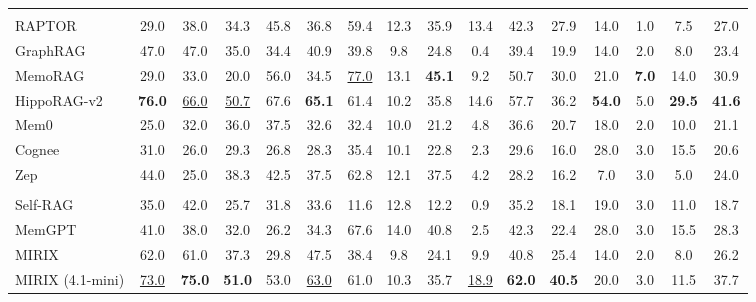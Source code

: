 \begin{table}[t]
{\begin{tabular}{l|cccc>{\columncolor{avgcolor}}c|cc>{\columncolor{avgcolor}}c|cc>{\columncolor{avgcolor}}c|cc>{\columncolor{avgcolor}}c|>{\columncolor{overallcolor}}c}
        \rowcolor{groupgreen}
        \multicolumn{16}{c}{\emph{Structure-Augmented RAG Agents}} \\
        RAPTOR      & 29.0 & 38.0 & 34.3 & 45.8 & 36.8 & 59.4 & 12.3 & 35.9 & 13.4 & 42.3 & 27.9 & 14.0 & 1.0 & 7.5 & 27.0 \\
        GraphRAG    & 47.0 & 47.0 & 35.0 & 34.4 & 40.9 & 39.8 & 9.8 & 24.8 & 0.4 & 39.4 & 19.9 & 14.0 & 2.0 & 8.0 & 23.4 \\
        MemoRAG     & 29.0 & 33.0 & 20.0 & 56.0 & 34.5 & \underline{77.0} & 13.1 & \textbf{45.1} & 9.2 & 50.7 & 30.0 & 21.0 & \textbf{7.0} & 14.0 & 30.9 \\
        HippoRAG-v2 & \textbf{76.0} & \underline{66.0} & \underline{50.7} & 67.6 & \textbf{65.1} & 61.4 & 10.2 & 35.8  & 14.6 & 57.7 & 36.2 & \textbf{54.0} & 5.0 & \textbf{29.5} & \textbf{41.6} \\
        Mem0        & 25.0 & 32.0 & 36.0 & 37.5 & 32.6 & 32.4 & 10.0 & 21.2 & 4.8 & 36.6 & 20.7 & 18.0 & 2.0 & 10.0 & 21.1 \\
        Cognee      & 31.0 & 26.0 & 29.3 & 26.8 & 28.3 & 35.4 & 10.1 & 22.8 & 2.3 & 29.6 & 16.0 & 28.0 & 3.0 & 15.5 & 20.6 \\
        Zep            & 44.0 & 25.0 & 38.3 & 42.5 & 37.5 & 62.8 & 12.1 & 37.5 & 4.2 & 28.2 & 16.2 & 7.0 & 3.0 & 5.0 & 24.0 \\
        \rowcolor{grouppink}
        \multicolumn{16}{c}{\emph{Agentic Memory Agents}} \\
        Self-RAG       & 35.0 & 42.0 & 25.7 & 31.8 & 33.6 & 11.6 & 12.8 & 12.2 & 0.9 & 35.2 & 18.1 & 19.0 & 3.0 & 11.0 & 18.7 \\
        MemGPT         & 41.0 & 38.0 & 32.0 & 26.2 & 34.3 & 67.6 & 14.0 & 40.8 & 2.5 & 42.3 & 22.4 & 28.0 & 3.0 & 15.5 & 28.3 \\
        MIRIX           & 62.0 & 61.0 & 37.3 & 29.8 & 47.5 & 38.4 & 9.8 & 24.1 & 9.9 & 40.8 & 25.4 & 14.0 & 2.0 & 8.0 & 26.2 \\
        MIRIX (4.1-mini)  & \underline{73.0} & \textbf{75.0} & \textbf{51.0} & 53.0 & \underline{63.0} & 61.0 & 10.3 & 35.7 & \underline{18.9} & \textbf{62.0} & \textbf{40.5} & 20.0 & 3.0 & 11.5 & 37.7 \\
        \bottomrule
    \end{tabular}
    }
    \vspace{-8pt}
\label{tab:overall_performance_comparison}
\end{table}


